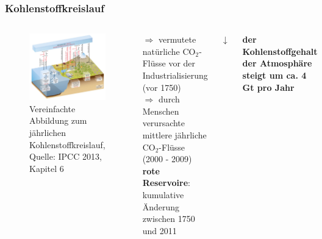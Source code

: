 \begin{frame}
\end{frame}

\begin{frame}
	\frametitle{Kohlenstoffkreislauf}
	\begin{columns}
		\begin{figure}
			\centering
			\includegraphics[width=0.9\linewidth]{bilder/IPCC_Cycles_carbon.jpg}
			\caption{Vereinfachte Abbildung zum jährlichen Kohlenstoffkreislauf, Quelle: IPCC 2013, Kapitel 6}
		\end{figure}
		$\Rightarrow$ vermutete natürliche CO$_2$-Flüsse vor der Industrialisierung (vor 1750)\\
		\color{red}$\Rightarrow${ }\color{black} durch Menschen verursachte mittlere jährliche CO$_2$-Flüsse (2000 - 2009) \\
		\color{red}\textbf{rote Reservoire}\color{black}: kumulative Änderung zwischen 1750 und 2011
		\begin{center}
			$\downarrow$
		\end{center}
		\textbf{der Kohlenstoffgehalt der Atmosphäre steigt um ca. 4 Gt pro Jahr}
	\end{columns}



\end{frame}
